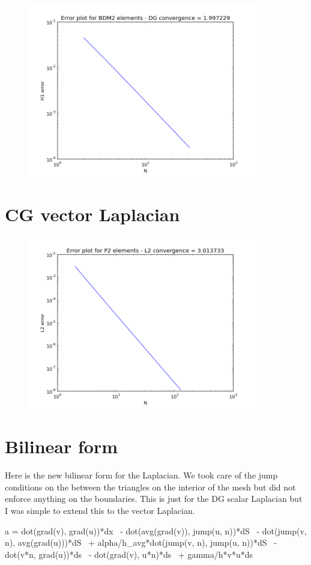 \documentclass[12pt]{extarticle}
\numberwithin{equation}{section}    %
\begin{document}
\begin{figure}[h!]
\centering
\includegraphics[width=10cm]{Plots/BDMDG}
\end{figure}


\newpage

\section*{CG vector Laplacian}

\begin{figure}[h!]
\centering
\includegraphics[width=10cm]{Plots/P2L2}
\end{figure}

\section*{Bilinear form}

Here is the new bilinear form for the Laplacian. We took care of the jump conditions on the between the triangles on the interior of the mesh but did not enforce anything on the boundaries. This is just for the DG scalar Laplacian but I was simple to extend this to the vector Laplacian.

\begin{python}
a = dot(grad(v), grad(u))*dx \
   - dot(avg(grad(v)), jump(u, n))*dS \
   - dot(jump(v, n), avg(grad(u)))*dS \
   + alpha/h_avg*dot(jump(v, n), jump(u, n))*dS \
   - dot(v*n, grad(u))*ds \
   - dot(grad(v), u*n)*ds \
   + gamma/h*v*u*ds
\end{python}
\end{document}
